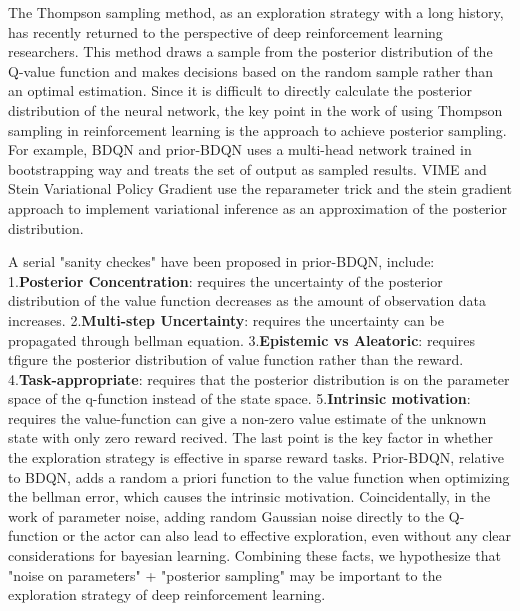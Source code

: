 The Thompson sampling method, as an exploration strategy with a long history, has recently returned to the perspective of deep reinforcement learning researchers. This method draws a sample from the posterior distribution of the Q-value function and makes decisions based on the random sample rather than an optimal estimation. Since it is difficult to directly calculate the posterior distribution of the neural network, the key point in the work of using Thompson sampling in reinforcement learning is the approach to achieve posterior sampling. For example, BDQN \cite{BDQN} and prior-BDQN \cite{osband2018randomized} uses a multi-head network trained in bootstrapping way and treats the set of output as sampled results. VIME \cite{VIME} and Stein Variational Policy Gradient \cite{liu2017stein} use the reparameter trick and the stein gradient approach to implement variational inference as an approximation of the posterior distribution. 

A serial "sanity checkes" have been proposed in prior-BDQN, include: 1.\textbf{Posterior Concentration}: requires the uncertainty of the posterior distribution of the value function decreases as the amount of observation data increases. 2.\textbf{Multi-step Uncertainty}: requires the uncertainty can be propagated through bellman equation. 3.\textbf{Epistemic vs Aleatoric}: requires tfigure the posterior distribution of value function rather than the reward. 4.\textbf{Task-appropriate}: requires that the posterior distribution is on the parameter space of the q-function instead of the state space. 5.\textbf{Intrinsic motivation}: requires the value-function can give a non-zero value estimate of the unknown state with only zero reward recived. The last point is the key factor in whether the exploration strategy is effective in sparse reward tasks. Prior-BDQN, relative to BDQN, adds a random a priori function to the value function when optimizing the bellman error, which causes the intrinsic motivation. Coincidentally, in the work of parameter noise, adding random Gaussian noise directly to the Q-function or the actor can also lead to effective exploration, even without any clear considerations for bayesian learning. Combining these facts, we hypothesize that "noise on parameters" + "posterior sampling" may be important to the exploration strategy of deep reinforcement learning.